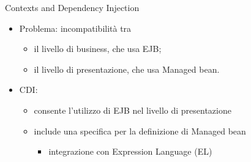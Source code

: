 \begin{frame}{Contexts and Dependency Injection}

\begin{itemize}
\item Problema: incompatibilità tra
	\begin{itemize}
	
	\vspace{0.5em}
	
	\item il livello di business, che usa EJB;
	
	\vspace{0.8em}
	
	\item il livello di presentazione, che usa Managed bean.
	\end{itemize}
	
\vspace{1em}	

\item CDI:
	\begin{itemize}
	
	\vspace{0.5em}
	
	\item consente l'utilizzo di EJB nel livello di presentazione
	
	\vspace{0.8em}
	
	\item include una specifica per la definizione di Managed bean
		\begin{itemize}
		
		\vspace{0.5em}
		
		\item integrazione con Expression Language (EL)
		\end{itemize}
	\end{itemize}
\end{itemize}

\end{frame}



